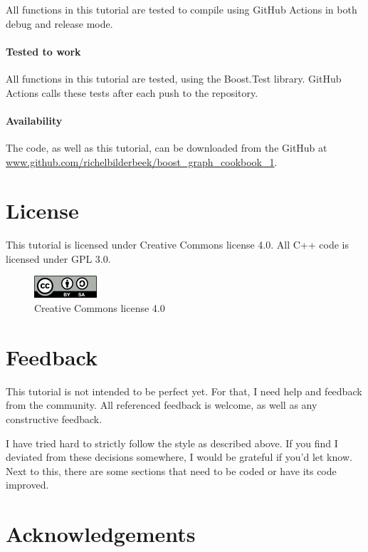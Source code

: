 All functions in this tutorial are tested to compile using GitHub Actions in
both debug and release mode.

\paragraph{Tested to work}

All functions in this tutorial are tested, using the Boost.Test library.
GitHub Actions calls these tests after each push to the repository.

\paragraph{Availability}

The code, as well as this tutorial, can be downloaded from the GitHub at
\url{www.github.com/richelbilderbeek/boost_graph_cookbook_1}.

\section{License}

This tutorial is licensed under Creative Commons license 4.0.
All C++ code is licensed under GPL 3.0.

\begin{figure}[!htbp]
  \includegraphics[]{CC-BY-SA_icon.png}
  \caption{
    Creative Commons license 4.0
  }
  \label{fig:license}
\end{figure}

\section{Feedback}

This tutorial is not intended to be perfect yet.
For that, I need help and feedback from the community.
All referenced feedback is welcome, as well as any constructive feedback.

I have tried hard to strictly follow the style as described above.
If you find I deviated from these decisions somewhere, I would be grateful
if you'd let know.
Next to this, there are some sections that need to be coded or have its
code improved.

\section{Acknowledgements}

